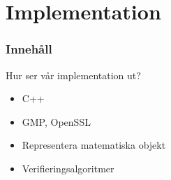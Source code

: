 \section{Implementation}
\begin{frame}
\frametitle{Innehåll}
\tableofcontents[currentsection]
\end{frame}

\begin{frame}{Hur ser vår implementation ut?}

\begin{itemize}
\item C++
\item GMP, OpenSSL
\item Representera matematiska objekt
\item Verifieringsalgoritmer
\end{itemize}

\begin{center}
\end{center}

\end{frame}
